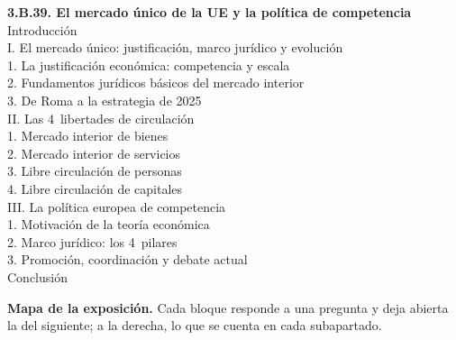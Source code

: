 \documentclass[11pt]{article}
\begin{document}
\begin{esquema}[unbreakable]
\textbf{3.B.39. El mercado único de la UE y la política de competencia}\\[2pt]
Introducción\\
I. El mercado único: justificación, marco jurídico y evolución\\
\hspace*{1.5em}1. La justificación económica: competencia y escala\\
\hspace*{1.5em}2. Fundamentos jurídicos básicos del mercado interior\\
\hspace*{1.5em}3. De Roma a la estrategia de 2025\\
II. Las 4~libertades de circulación\\
\hspace*{1.5em}1. Mercado interior de bienes\\
\hspace*{1.5em}2. Mercado interior de servicios\\
\hspace*{1.5em}3. Libre circulación de personas\\
\hspace*{1.5em}4. Libre circulación de capitales\\
III. La política europea de competencia\\
\hspace*{1.5em}1. Motivación de la teoría económica\\
\hspace*{1.5em}2. Marco jurídico: los 4~pilares\\
\hspace*{1.5em}3. Promoción, coordinación y debate actual\\
Conclusión
\end{esquema}

\begin{anotaciones}
\textbf{Mapa de la exposición.} Cada bloque responde a una pregunta y deja abierta la del siguiente; a la derecha, lo que se cuenta en cada subapartado.
\begin{infografiacaja}
\caption{Mapa del tema: la pregunta de cada bloque y el hilo que los une}\label{figu:mapa-tema}
\end{infografiacaja}
\end{anotaciones}
\end{document}

